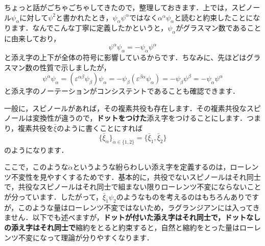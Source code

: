 \documentclass[a4paper,uplatex,dvipdfmx]{jsarticle}
\theoremstyle{definition}
\begin{document}
{
  \small
  ちょっと話がごちゃごちゃしてきたので，整理しておきます．上では，スピノール$\psi_{\alpha}に対して$$\psi^2$と書かれたとき，$\psi_{\alpha}\psi^{\alpha}$ではなく$\alpha^{\alpha}\psi_{\alpha}$と読むと約束したことになります．なんでこんな丁寧に定義したかというと，$\psi_{\alpha}$がグラスマン数であることに由来しており，
  \begin{equation*}
    \psi^{\alpha}\psi_{\alpha}
    =
    -\psi_{\alpha}\psi^{\alpha}
  \end{equation*}
  と添え字の上下が全体の符号に影響しているからです．ちなみに、先ほどはグラスマン数の性質で示しましたが，
  \begin{equation*}
    \psi^{\alpha}\psi_{\alpha}
    =
    (\varepsilon^{\alpha\beta}\psi_{\beta})\psi_{\alpha}
    =
    -\psi_{\beta}(\varepsilon^{\beta\alpha}\psi_{\alpha})
    =
    -\psi_{\beta}\psi^{\beta}
    =
    -\psi_{\alpha}\psi^{\alpha}
  \end{equation*}
  と添え字のノーテーションがコンシステントであることも確認できます．
}

\vspace{7pt}

一般に，スピノールがあれば，その複素共役も存在します．その複素共役なスピノールは変換性が違うので，\textbf{ドットをつけた}添え字をつけることにします．つまり，複素共役を$\bar{\xi}$のように書くことにすれば
\begin{equation}
  \{\bar{\xi}_{\dot{\alpha}}\}_{\dot{\alpha}\in\{\dot{1},\dot{2}\}}
  =
  \{\bar{\xi}_{\dot{1}},\bar{\xi}_{\dot{2}}\}
\end{equation}
のようになります．

\vspace{1em}

{
  \small
  ここで，このような$\dot{\alpha}$というような紛らわしい添え字を定義するのは，ローレンツ不変性を見やすくするためです．基本的に，共役でないスピノールはそれ同士で，共役なスピノールはそれ同士で組まない限りローレンツ不変にならないことが分っています．したがって，$\bar{\xi}_{\dot{1}}\psi_{2}$のようなものを考えるのはもちろんありですが，このような量はローレンツ不変ではないため，ラグランジアンには入ってきません．以下でも述べますが，\textbf{ドットが付いた添え字はそれ同士で，ドットなしの添え字はそれ同士で}縮約をとると約束すると，自然と縮約をとった量はローレンツ不変になって理論が分りやすくなります．
}

\vspace{1em}
\end{document}
